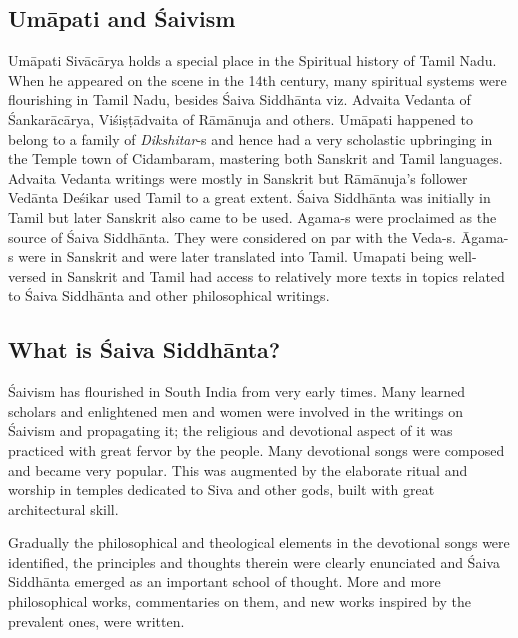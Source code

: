 \subsection{Umāpati and Śaivism}

\vskip -4pt

Umāpati Sivācārya holds a special place in the Spiritual history of Tamil Nadu. When he appeared on the scene in the 14th century, many spiritual systems were flourishing in Tamil Nadu, besides Śaiva Siddhānta viz. Advaita Vedanta of Śankarācārya, Viśiṣṭādvaita of Rāmānuja and others. Umāpati happened to belong to a family of \textit{Dikshitar}-s and hence had a very scholastic upbringing in the Temple town of Cidambaram, mastering both Sanskrit and Tamil languages. Advaita Vedanta writings were mostly in Sanskrit but Rāmānuja’s follower Vedānta Deśikar used Tamil to a great extent. Śaiva Siddhānta was initially in Tamil but later Sanskrit also came to be used. Agama-s were proclaimed as the source of Śaiva Siddhānta. They were considered on par with the Veda-s. Āgama-s were in Sanskrit and were later translated into Tamil. Umapati being well-versed in Sanskrit and Tamil had access to relatively more texts in topics related to Śaiva Siddhānta and other philosophical writings.


\subsection{What is Śaiva Siddhānta?}

\vskip -4pt

Śaivism has flourished in South India from very early times. Many learned scholars and enlightened men and women were involved in the writings on Śaivism and propagating it; the religious and devotional aspect of it was practiced with great fervor by the people. Many devotional songs were composed and became very popular. This was augmented by the elaborate ritual and worship in temples dedicated to Siva and other gods, built with great architectural skill.

Gradually the philosophical and theological elements in the devotional songs were identified, the principles and thoughts therein were clearly enunciated and Śaiva Siddhānta emerged as an important school of thought. More and more philosophical works, commentaries on them, and new works inspired by the prevalent ones, were written.


